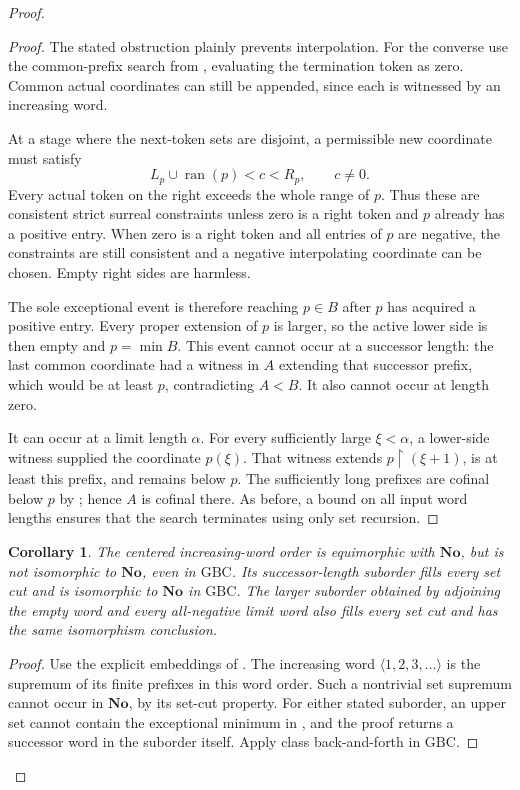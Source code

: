 \documentclass[11pt]{article}
\newtheorem{corollary}[corollary]{Corollary}
\theoremstyle{definition}
\theoremstyle{remark}
\newcommand{\No}{\mathbf{No}}
\begin{document}
\begin{proof}
\begin{proof}
The stated obstruction plainly prevents interpolation.  For the
converse use the common-prefix search from
, evaluating the termination token as
zero.  Common actual coordinates can still be appended, since each
is witnessed by an increasing word.

At a stage where the next-token sets are disjoint, a permissible
new coordinate must satisfy
\[
       L_p\cup\operatorname{ran}(p)<c<R_p,\qquad c\ne0.
\]
Every actual token on the right exceeds the whole range of \(p\).
Thus these are consistent strict surreal constraints unless zero
is a right token and \(p\) already has a positive entry.
When zero is a right token and all entries of \(p\) are negative,
the constraints are still consistent and a negative interpolating
coordinate can be chosen.  Empty right sides are harmless.

The sole exceptional event is therefore reaching \(p\in B\)
after \(p\) has acquired a positive entry.  Every proper extension
of \(p\) is larger, so the active lower side is then empty and
\(p=\min B\).  This event cannot occur at a successor length:
the last common coordinate had a witness in \(A\) extending that
successor prefix, which would be at least \(p\), contradicting
\(A<B\).  It also cannot occur at length zero.

It can occur at a limit length \(\alpha\).  For every sufficiently
large \(\xi<\alpha\), a lower-side witness supplied the coordinate
\(p(\xi)\).  That witness extends
\(p\restriction(\xi+1)\), is at least this prefix, and remains below
\(p\).  The sufficiently long prefixes are cofinal below \(p\)
by ; hence \(A\) is cofinal there.
As before, a bound on all input word lengths ensures that the search
terminates using only set recursion.
\end{proof}

\begin{corollary}
\label{swo:sh:wv:inc-corollary}
The centered increasing-word order is equimorphic with \(\No\),
but is not isomorphic to \(\No\), even in \(\mathrm{GBC}\).
Its successor-length suborder fills every set cut and is isomorphic
to \(\No\) in \(\mathrm{GBC}\).  The larger suborder obtained by
adjoining the empty word and every all-negative limit word also
fills every set cut and has the same isomorphism conclusion.
\end{corollary}

\begin{proof}
Use the explicit embeddings of .
The increasing word \(\langle1,2,3,\ldots\rangle\) is the supremum
of its finite prefixes in this word order.  Such a nontrivial set
supremum cannot occur in \(\No\), by its set-cut property.
For either stated suborder, an upper set cannot contain the
exceptional minimum in , and the proof
returns a successor word in the suborder itself.  Apply class
back-and-forth in \(\mathrm{GBC}\).
\end{proof}


\end{proof}
\end{document}
